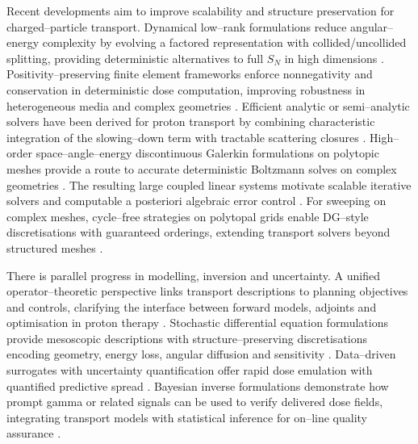 \documentclass[final]{amsart}
\begin{document}
Recent developments aim to improve scalability and structure
preservation for charged--particle transport. Dynamical low--rank
formulations reduce angular--energy complexity by evolving a factored
representation with collided/uncollided splitting, providing
deterministic alternatives to full $S_N$ in high dimensions
\cite{stammer2024deterministic}. Positivity--preserving finite element
frameworks enforce nonnegativity and conservation in deterministic
dose computation, improving robustness in heterogeneous media and
complex geometries \cite{ashby2025positivity}. Efficient analytic or
semi--analytic solvers have been derived for proton transport by
combining characteristic integration of the slowing--down term with
tractable scattering closures \cite{ashby2025efficient}.  High--order
space--angle--energy discontinuous Galerkin formulations on polytopic
meshes provide a route to accurate deterministic Boltzmann solves on
complex geometries \cite{houston2024efficient}. The resulting large
coupled linear systems motivate scalable iterative solvers and
computable a posteriori algebraic error control
\cite{houston2024iterative}.  For sweeping on complex meshes,
cycle--free strategies on polytopal grids enable DG--style
discretisations with guaranteed orderings, extending transport solvers
beyond structured meshes \cite{calloo2025cycle,Evans2026}.

There is parallel progress in modelling, inversion and uncertainty. A
unified operator--theoretic perspective links transport descriptions
to planning objectives and controls, clarifying the interface between
forward models, adjoints and optimisation in proton therapy
\cite{kyprianou2025unified}. Stochastic differential equation
formulations provide mesoscopic descriptions with
structure--preserving discretisations encoding geometry, energy loss,
angular diffusion and sensitivity
\cite{crossley2025jump,dean2025fast,chronholm2025geometry}. Data--driven
surrogates with uncertainty quantification offer rapid dose emulation
with quantified predictive spread \cite{pim2025surrogate}. Bayesian
inverse formulations demonstrate how prompt gamma or related signals
can be used to verify delivered dose fields, integrating transport
models with statistical inference for on--line quality assurance
\cite{cox2024bayesian}.
\end{document}
